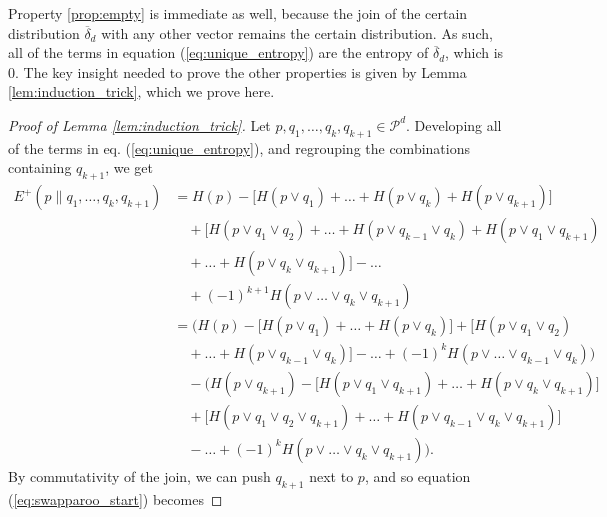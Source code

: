 Property \ref{prop:empty} is immediate as well, because the join of the certain distribution $\overline{\delta}_d$ with any other vector remains the certain distribution. As such, all of the terms in equation (\ref{eq:unique_entropy}) are the entropy of $\overline{\delta}_d$, which is 0.  The key insight needed to prove the other properties is given by Lemma \ref{lem:induction_trick}, which we prove here.

\begin{proof}[Proof of Lemma \ref{lem:induction_trick}]
    Let $p, q_1, \dots, q_k, q_{k+1} \in \mathcal{P}^d$. Developing all of the terms in eq. (\ref{eq:unique_entropy}), and regrouping the combinations containing $q_{k+1}$, we get
    \begin{align}
        E^+(p \parallel q_1, \dots, q_k, q_{k+1}) &= H(p) - \Big[H(p \vee q_1) + \dots + H(p \vee q_k) + H(p \vee q_{k+1})\Big] \nonumber \\
                                                  &\quad + \Big[H(p \vee q_1 \vee q_2) + \dots + H(p \vee q_{k-1} \vee q_k) + H(p \vee q_1 \vee q_{k+1}) \nonumber \\
                                                  &\quad + \dots + H(p \vee q_k \vee q_{k+1})\Big] - \dots\nonumber \\
                                                  &\quad + (-1)^{k+1} H(p \vee \dots \vee q_k \vee q_{k+1})\\
                                                  &= \Big(H(p) - \big[H(p \vee q_1) + \dots + H(p \vee q_k)\big] + \big[H(p \vee q_1 \vee q_2)\nonumber \\
                                                  &\quad + \dots + H(p \vee q_{k-1} \vee q_k)\big] - \dots + (-1)^{k} H(p \vee \dots \vee q_{k-1} \vee q_{k})\Big) \nonumber \\
                                                  &\quad - \Big(H(p \vee q_{k+1}) - \big[H(p \vee q_1 \vee q_{k+1}) + \dots + H(p \vee q_k \vee q_{k+1})\big]\nonumber \\
                                                  &\quad + \big[H(p \vee q_1 \vee q_2 \vee q_{k+1}) + \dots + H(p \vee q_{k-1} \vee q_k \vee q_{k+1})\big]\nonumber \\
                                                  &\quad - \dots + (-1)^{k} H(p \vee \dots \vee q_k \vee q_{k+1})\Big). \label{eq:swapparoo_start}
    \end{align}
    By commutativity of the join, we can push $q_{k+1}$ next to $p$, and so equation (\ref{eq:swapparoo_start}) becomes

\end{proof}
